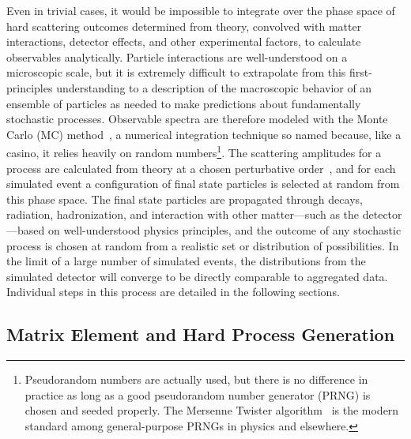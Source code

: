 Even in trivial cases, it would be impossible to integrate over the phase space of hard scattering outcomes determined from theory, convolved with matter interactions, detector effects, and other experimental factors, to calculate observables analytically.
Particle interactions are well-understood on a microscopic scale, but it is extremely difficult to extrapolate from this first-principles understanding to a description of the macroscopic behavior of an ensemble of particles as needed to make predictions about fundamentally stochastic processes.
Observable spectra are therefore modeled with the Monte Carlo (MC) method~\cite{Metropolis:10.2307.2280232,Olive:2016xmw}, a numerical integration technique so named because, like a casino, it relies heavily on random numbers\footnote{Pseudorandom numbers are actually used, but there is no difference in practice as long as a good pseudorandom number generator (PRNG) is chosen and seeded properly. The Mersenne Twister algorithm~\cite{Matsumoto:1998:MTE:272991.272995} is the modern standard among general-purpose PRNGs in physics and elsewhere.}.
The scattering amplitudes for a process are calculated from theory at a chosen perturbative order~\cite{Brock:1993sz}, and for each simulated event a configuration of final state particles is selected at random from this phase space.
The final state particles are propagated through decays, radiation, hadronization, and interaction with other matter---such as the detector---based on well-understood physics principles, and the outcome of any stochastic process is chosen at random from a realistic set or distribution of possibilities.
In the limit of a large number of simulated events, the distributions from the simulated detector will converge to be directly comparable to aggregated data.
Individual steps in this process are detailed in the following sections.


\subsection{Matrix Element and Hard Process Generation}

